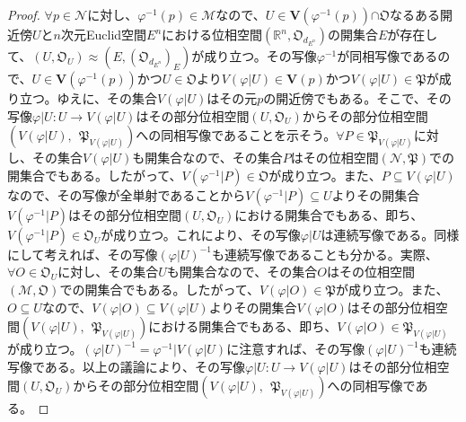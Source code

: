 \documentclass[dvipdfmx]{jsarticle}
\begin{document}
\begin{proof}
$\forall p \in \mathcal{N}$に対し、$\varphi^{- 1}(p)\in \mathcal{M}$なので、$U \in \mathbf{V}\left( \varphi^{- 1}(p) \right)\mathfrak{\cap O}$なるある開近傍$U$と$n$次元Euclid空間$E^{n}$における位相空間$\left( \mathbb{R}^{n},\mathfrak{O}_{d_{E^{n}}} \right)$の開集合$E$が存在して、$\left( U,\mathfrak{O}_{U} \right) \approx \left( E,\left( \mathfrak{O}_{d_{E^{n}}} \right)_{E} \right)$が成り立つ。その写像$\varphi^{- 1}$が同相写像であるので、$U \in \mathbf{V}\left( \varphi^{- 1}(p) \right)$かつ$U \in \mathfrak{O}$より$V\left( \varphi|U \right) \in \mathbf{V}(p)$かつ$V\left( \varphi|U \right)\in \mathfrak{P}$が成り立つ。ゆえに、その集合$V\left( \varphi|U \right)$はその元$p$の開近傍でもある。そこで、その写像$\varphi|U:U \rightarrow V\left( \varphi|U \right)$はその部分位相空間$\left( U,\mathfrak{O}_{U} \right)$からその部分位相空間$\left( V\left( \varphi|U \right),\ \ \mathfrak{P}_{V\left( \varphi|U \right)} \right)$への同相写像であることを示そう。$\forall P \in \mathfrak{P}_{V\left( \varphi|U \right)}$に対し、その集合$V\left( \varphi|U \right)$も開集合なので、その集合$P$はその位相空間$\left( \mathcal{N},\mathfrak{P} \right)$での開集合でもある。したがって、$V\left( \varphi^{- 1}|P \right)\in \mathfrak{O}$が成り立つ。また、$P \subseteq V\left( \varphi|U \right)$なので、その写像が全単射であることから$V\left( \varphi^{- 1}|P \right) \subseteq U$よりその開集合$V\left( \varphi^{- 1}|P \right)$はその部分位相空間$\left( U,\mathfrak{O}_{U} \right)$における開集合でもある、即ち、$V\left( \varphi^{- 1}|P \right) \in \mathfrak{O}_{U}$が成り立つ。これにより、その写像$\varphi|U$は連続写像である。同様にして考えれば、その写像$\left( \varphi|U \right)^{- 1}$も連続写像であることも分かる。実際、$\forall O \in \mathfrak{O}_{U}$に対し、その集合$U$も開集合なので、その集合$O$はその位相空間$\left( \mathcal{M},\mathfrak{O} \right)$での開集合でもある。したがって、$V\left( \varphi|O \right)\in \mathfrak{P}$が成り立つ。また、$O \subseteq U$なので、$V\left( \varphi|O \right) \subseteq V\left( \varphi|U \right)$よりその開集合$V\left( \varphi|O \right)$はその部分位相空間$\left( V\left( \varphi|U \right),\ \ \mathfrak{P}_{V\left( \varphi|U \right)} \right)$における開集合でもある、即ち、$V\left( \varphi|O \right) \in \mathfrak{P}_{V\left( \varphi|U \right)}$が成り立つ。$\left( \varphi|U \right)^{- 1} = \varphi^{- 1}|V\left( \varphi|U \right)$に注意すれば、その写像$\left( \varphi|U \right)^{- 1}$も連続写像である。以上の議論により、その写像$\varphi|U:U \rightarrow V\left( \varphi|U \right)$はその部分位相空間$\left( U,\mathfrak{O}_{U} \right)$からその部分位相空間$\left( V\left( \varphi|U \right),\ \ \mathfrak{P}_{V\left( \varphi|U \right)} \right)$への同相写像である。\par

\end{proof}
\end{document}

